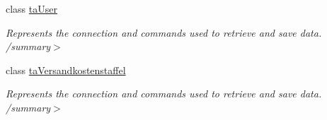 \begin{DoxyCompactItemize}
class \hyperlink{class_products_1_1_data_1_1ds_sage_table_adapters_1_1ta_user}{ta\+User}
\begin{DoxyCompactList}\small\item\em Represents the connection and commands used to retrieve and save data. /summary$>$ \end{DoxyCompactList}\item 
class \hyperlink{class_products_1_1_data_1_1ds_sage_table_adapters_1_1ta_versandkostenstaffel}{ta\+Versandkostenstaffel}
\begin{DoxyCompactList}\small\item\em Represents the connection and commands used to retrieve and save data. /summary$>$ \end{DoxyCompactList}\end{DoxyCompactItemize}
